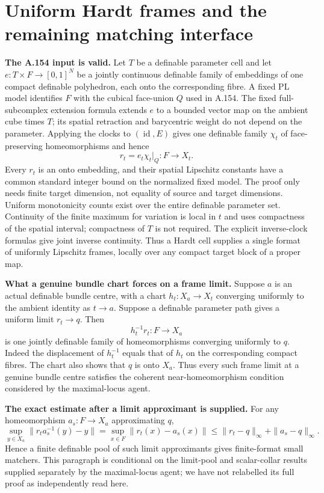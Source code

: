 \section*{Uniform Hardt frames and the remaining matching interface}

\textbf{The A.154 input is valid.}\quad
Let \(T\) be a definable parameter cell and let
\(e:T\times F\to[0,1]^N\) be a jointly continuous definable family
of embeddings of one compact definable polyhedron, each onto the
corresponding fibre.  A fixed PL model identifies \(F\) with the
cubical face-union \(Q\) used in A.154.  The fixed full-subcomplex
extension formula extends \(e\) to a bounded vector map on the
ambient cube times \(T\); its spatial retraction and barycentric
weight do not depend on the parameter.  Applying the clocks to
\((\operatorname{id},E)\) gives one definable family \(\chi_t\) of
face-preserving homeomorphisms and hence
\[
 r_t=e_t\chi_t|_Q:F\longrightarrow X_t.
\]
Every \(r_t\) is an onto embedding, and their spatial Lipschitz
constants have a common standard integer bound on the normalized
fixed model.  The proof only needs finite target dimension, not
equality of source and target dimensions.  Uniform monotonicity
counts exist over the entire definable parameter set.  Continuity
of the finite maximum for variation is local in \(t\) and uses
compactness of the spatial interval; compactness of \(T\) is not
required.  The explicit inverse-clock formulas give joint inverse
continuity.  Thus a Hardt cell supplies a single format of uniformly
Lipschitz frames, locally over any compact target block of a proper
map.

\textbf{What a genuine bundle chart forces on a frame limit.}\quad
Suppose \(a\) is an actual definable bundle centre, with a chart
\(h_t:X_a\to X_t\) converging uniformly to the ambient identity as
\(t\to a\).  Suppose a definable parameter path gives a uniform
limit \(r_t\to q\).  Then
\[
 h_t^{-1}r_t:F\longrightarrow X_a
\]
is one jointly definable family of homeomorphisms converging
uniformly to \(q\).  Indeed the displacement of \(h_t^{-1}\) equals
that of \(h_t\) on the corresponding compact fibres.  The chart
also shows that \(q\) is onto \(X_a\).
Thus every such frame limit at a genuine bundle centre satisfies
the coherent near-homeomorphism condition considered by the
maximal-locus agent.

\textbf{The exact estimate after a limit approximant is supplied.}\quad
For any homeomorphism \(a_s:F\to X_a\) approximating \(q\),
\[
 \sup_{y\in X_a}\|r_ta_s^{-1}(y)-y\|
 =\sup_{x\in F}\|r_t(x)-a_s(x)\|
 \le\|r_t-q\|_\infty+\|a_s-q\|_\infty.
\]
Hence a finite definable pool of such limit approximants gives
finite-format small matchers.  This paragraph is conditional on
the limit-pool and scalar-collar results supplied separately by the
maximal-locus agent; we have not relabelled its full proof as
independently read here.

